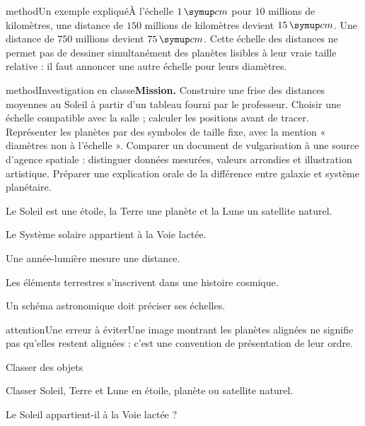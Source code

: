 \begin{pcEncadre}{method}{Un exemple expliqué}À l’échelle $1\unite{cm}$ pour $10$ millions de kilomètres, une distance de $150$ millions de kilomètres devient $15\unite{cm}$. Une distance de $750$ millions devient $75\unite{cm}$. Cette échelle des distances ne permet pas de dessiner simultanément des planètes lisibles à leur vraie taille relative : il faut annoncer une autre échelle pour leurs diamètres.\end{pcEncadre}
\label{activite-7}
\begin{pcEncadre}{method}{Investigation en classe}\textbf{Mission.} Construire une frise des distances moyennes au Soleil à partir d’un tableau fourni par le professeur. Choisir une échelle compatible avec la salle ; calculer les positions avant de tracer. Représenter les planètes par des symboles de taille fixe, avec la mention « diamètres non à l’échelle ». Comparer un document de vulgarisation à une source d’agence spatiale : distinguer données mesurées, valeurs arrondies et illustration artistique. Préparer une explication orale de la différence entre galaxie et système planétaire.\end{pcEncadre}
\begin{questions}
\item Le Soleil est une étoile, la Terre une planète et la Lune un satellite naturel.
\item Le Système solaire appartient à la Voie lactée.
\item Une année-lumière mesure une distance.
\item Les éléments terrestres s’inscrivent dans une histoire cosmique.
\item Un schéma astronomique doit préciser ses échelles.
\end{questions}
\begin{pcEncadre}{attention}{Une erreur à éviter}Une image montrant les planètes alignées ne signifie pas qu’elles restent alignées : c’est une convention de présentation de leur ordre.\end{pcEncadre}
\pcGrille
\clearpage{}
\par\noindent\begin{minipage}{\linewidth}
\begin{exercice}[1]{Classer des objets}
\begin{questions}
\item Classer Soleil, Terre et Lune en étoile, planète ou satellite naturel.
\item Le Soleil appartient-il à la Voie lactée ?
\end{questions}
\end{exercice}
\end{minipage}
